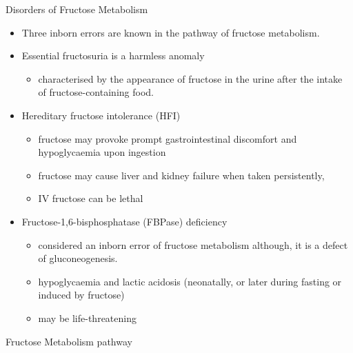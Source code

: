 \documentclass[presentation, smaller]{beamer}
\begin{document}
\begin{frame}[label={sec:org28a8028}]{Disorders of Fructose Metabolism}
\begin{itemize}
\item Three inborn errors are known in the pathway of fructose metabolism.
\item Essential fructosuria is a harmless anomaly
\begin{itemize}
\item characterised by the appearance of fructose in the urine after the intake of fructose-containing food.
\end{itemize}
\item Hereditary fructose intolerance (HFI)
\begin{itemize}
\item fructose may provoke prompt gastrointestinal discomfort and hypoglycaemia upon ingestion
\item fructose may cause liver and kidney failure when taken persistently,
\item IV fructose can be lethal
\end{itemize}
\item Fructose-1,6-bisphosphatase (FBPase) deficiency
\begin{itemize}
\item considered an inborn error of fructose metabolism although, it is a defect of gluconeogenesis.
\item hypoglycaemia and lactic acidosis (neonatally, or later during fasting or induced by fructose)
\item may be life-threatening
\end{itemize}
\end{itemize}
\end{frame}

\begin{frame}[label={sec:orgb434875}]{Fructose Metabolism}
pathway
\end{frame}
\end{document}
